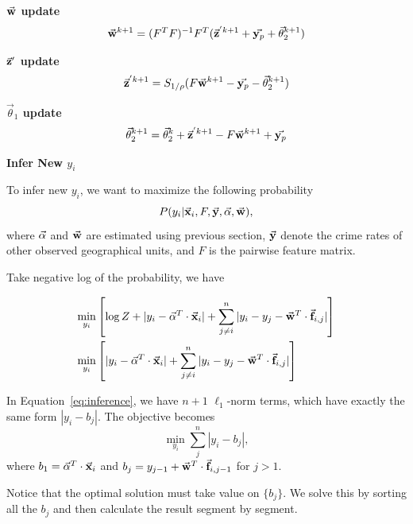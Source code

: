 \textbf{$\vec{\mathbf{w}}$ update}
\[ \vec{\mathbf{w}}^{k+1} = (F^TF)^{-1} F^T(\vec{\mathbf{z}}^{'k+1} + \vec{\mathbf{y}_p} + \vec\theta_2^{k+1}) \]

\textbf{$\vec{\mathbf{z}}'$ update}
\[ \vec{\mathbf{z}}^{'k+1} = S_{1/\rho}(F\vec{\mathbf{w}}^{k+1} - \vec{\mathbf{y}_p} - \vec\theta_2^{k+1}) \]

\textbf{$\vec\theta_1$ update}
\[ \vec\theta_2^{k+1} = \vec\theta_2^{k} + \vec{\mathbf{z}}^{'k+1} - F\vec{\mathbf{w}}^{k+1} + \vec{\mathbf{y}_p} \]



\textbf{Infer New $y_i$}

To infer new $y_i$, we want to maximize the following probability
\[ P(y_i | \vec{\mathbf{x}}_i, F, \vec{\mathbf{y}}, \vec{\mathbf{\alpha}}, \vec{\mathbf{w}}), \]
where $\vec{\mathbf{\alpha}}$ and $\vec{\mathbf{w}}$ are estimated using previous section, $\vec{\mathbf{y}}$ denote the crime rates of other observed geographical units, and $F$ is the pairwise feature matrix.

Take negative log of the probability, we have 

\begin{align}
\min_{y_i} &  \left[ \log Z +  |y_i - \vec{\mathbf{\alpha}}^T \cdot \vec{\mathbf{x}}_i| + \sum_{j \neq i}^n |y_i - y_j - \vec{\mathbf{w}}^T \cdot \vec{\mathbf{f}}_{i,j}| \right] \nonumber \\
\min_{y_i} & \left[ |y_i - \vec{\mathbf{\alpha}}^T \cdot \vec{\mathbf{x}}_i| + \sum_{j \neq i}^n |y_i - y_j - \vec{\mathbf{w}}^T \cdot \vec{\mathbf{f}}_{i,j}| \right] 
\label{eq:inference}
\end{align}

In Equation~\ref{eq:inference}, we have $n+1$ $\ell_1$-norm terms, which have exactly the same form $|y_i - b_j|$. The objective becomes
\begin{equation}
  \min_{y_i} \sum_j^n |y_i - b_j|,
\label{eq:infy}
\end{equation}
where $b_1 = \vec{\mathbf{\alpha}}^T \cdot \vec{\mathbf{x}}_i$ and $b_j = y_{j-1} + \vec{\mathbf{w}}^T\cdot \vec{\mathbf{f}}_{i,j-1}$ for $j > 1$.

Notice that the optimal solution must take value on $\{b_j\}$. We solve this by sorting all the $b_j$ and then calculate the result segment by segment.




